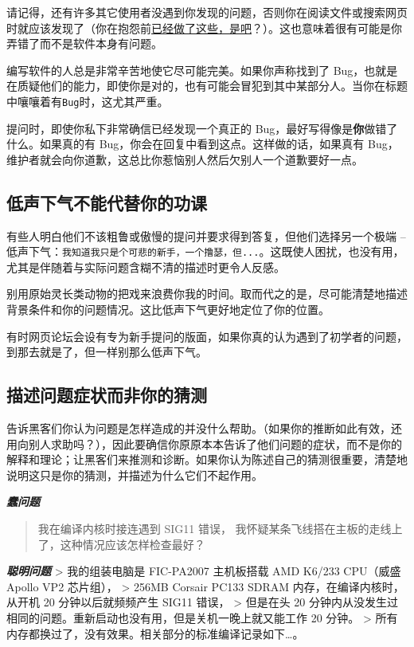 \documentclass[titlepage]{article}
\begin{document}
请记得，还有许多其它使用者没遇到你发现的问题，否则你在阅读文件或搜索网页时就应该发现了（你在抱怨前\protect\hyperlink{ux5728ux63d0ux95eeux4e4bux524d}{已经做了这些，是吧}？）。这也意味着很有可能是你弄错了而不是软件本身有问题。

编写软件的人总是非常辛苦地使它尽可能完美。如果你声称找到了
Bug，也就是在质疑他们的能力，即使你是对的，也有可能会冒犯到其中某部分人。当你在标题中嚷嚷着有\texttt{Bug}时，这尤其严重。

提问时，即使你私下非常确信已经发现一个真正的
Bug，最好写得像是\textbf{你}做错了什么。如果真的有
Bug，你会在回复中看到这点。这样做的话，如果真有
Bug，维护者就会向你道歉，这总比你惹恼别人然后欠别人一个道歉要好一点。

\subsection{低声下气不能代替你的功课}\label{ux4f4eux58f0ux4e0bux6c14ux4e0dux80fdux4ee3ux66ffux4f60ux7684ux529fux8bfe}

有些人明白他们不该粗鲁或傲慢的提问并要求得到答复，但他们选择另一个极端
--
低声下气：\texttt{我知道我只是个可悲的新手，一个撸瑟，但...}。这既使人困扰，也没有用，尤其是伴随着与实际问题含糊不清的描述时更令人反感。

别用原始灵长类动物的把戏来浪费你我的时间。取而代之的是，尽可能清楚地描述背景条件和你的问题情况。这比低声下气更好地定位了你的位置。

有时网页论坛会设有专为新手提问的版面，如果你真的认为遇到了初学者的问题，到那去就是了，但一样别那么低声下气。

\subsection{描述问题症状而非你的猜测}\label{ux63cfux8ff0ux95eeux9898ux75c7ux72b6ux800cux975eux4f60ux7684ux731cux6d4b}

告诉黑客们你认为问题是怎样造成的并没什么帮助。（如果你的推断如此有效，还用向别人求助吗？），因此要确信你原原本本告诉了他们问题的症状，而不是你的解释和理论；让黑客们来推测和诊断。如果你认为陈述自己的猜测很重要，清楚地说明这只是你的猜测，并描述为什么它们不起作用。

\textbf{\emph{蠢问题}}

\begin{quote}
我在编译内核时接连遇到 SIG11 错误，
我怀疑某条飞线搭在主板的走线上了，这种情况应该怎样检查最好？
\end{quote}

\textbf{\emph{聪明问题}} \textgreater{} 我的组装电脑是 FIC-PA2007
主机板搭载 AMD K6/233 CPU（威盛 Apollo VP2 芯片组）， \textgreater{}
256MB Corsair PC133 SDRAM 内存，在编译内核时，从开机 20
分钟以后就频频产生 SIG11 错误， \textgreater{} 但是在头 20
分钟内从没发生过相同的问题。重新启动也没有用，但是关机一晚上就又能工作
20 分钟。 \textgreater{}
所有内存都换过了，没有效果。相关部分的标准编译记录如下\ldots{}。
\end{document}
